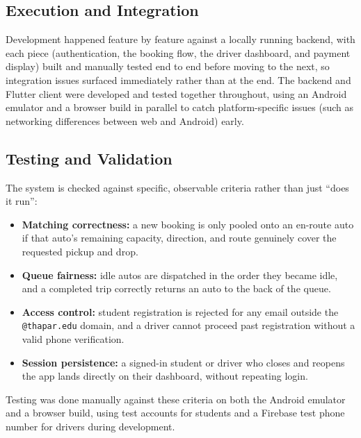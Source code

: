 \documentclass[11pt]{article}
\begin{document}
\subsection{Execution and Integration}
Development happened feature by feature against a locally running backend, with each piece (authentication, the booking flow, the driver dashboard, and payment display) built and manually tested end to end before moving to the next, so integration issues surfaced immediately rather than at the end. The backend and Flutter client were developed and tested together throughout, using an Android emulator and a browser build in parallel to catch platform-specific issues (such as networking differences between web and Android) early.

\subsection{Testing and Validation}
The system is checked against specific, observable criteria rather than just ``does it run'':
\begin{itemize}[leftmargin=1.4em, itemsep=0.2em]
  \item \textbf{Matching correctness:} a new booking is only pooled onto an en-route auto if that auto's remaining capacity, direction, and route genuinely cover the requested pickup and drop.
  \item \textbf{Queue fairness:} idle autos are dispatched in the order they became idle, and a completed trip correctly returns an auto to the back of the queue.
  \item \textbf{Access control:} student registration is rejected for any email outside the \texttt{@thapar.edu} domain, and a driver cannot proceed past registration without a valid phone verification.
  \item \textbf{Session persistence:} a signed-in student or driver who closes and reopens the app lands directly on their dashboard, without repeating login.
\end{itemize}
Testing was done manually against these criteria on both the Android emulator and a browser build, using test accounts for students and a Firebase test phone number for drivers during development.
\end{document}
